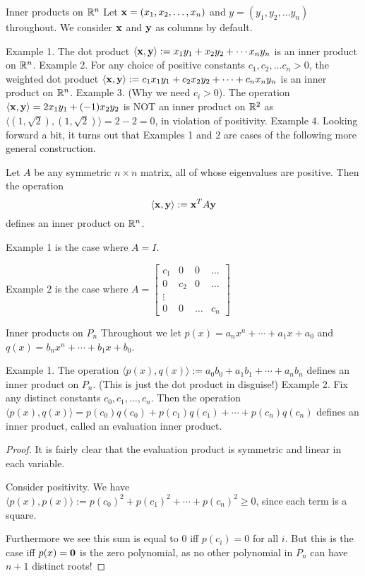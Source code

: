 \begin{frame}{Inner products on ${\mathbb R}^n$}
Let ${\mathbf x}=(x_1,x_2,\dots ,x_n)$ and $y=(y_1,y_2,\dots y_n)$ throughout. We consider ${\mathbf x}$ and ${\mathbf y}$ as columns by default. 

\alert{Example 1}. The \alert{dot product} $\langle{\mathbf x},{\mathbf y}\rangle:=x_1y_1+x_2y_2+\cdots x_ny_n$ is an inner product on ${\mathbb R}^n$. 
\bpause
\alert{Example 2}. For any choice of \alert{positive constants} $c_1,c_2,\dots c_n>0$, the \alert{weighted dot product} $\langle {\mathbf x},{\mathbf y}\rangle:=c_1x_1y_1+c_2x_2y_2+\cdots +c_nx_ny_n$ is an inner product on ${\mathbb R}^n$. 
\bpause
\alert{Example 3}. (Why we need $c_i>0$). The operation $\langle{\mathbf x},{\mathbf y}\rangle=2x_1y_1+(-1)x_2y_2$ is NOT an inner product on ${\mathbb R}^2$ as $\langle (1,\sqrt{2}), (1,\sqrt{2})\rangle=2-2=0$, in violation of positivity. 
\bpause
\alert{Example 4}. Looking forward a bit, it turns out that Examples 1 and 2 are cases of the following more general construction. 

Let $A$ be any symmetric $n\times n$ matrix, all of whose eigenvalues are \alert{positive}. Then the operation 
\[
\langle {\mathbf x}, {\mathbf y}\rangle:={\mathbf x}^TA{\mathbf y}
\]
defines an inner product on ${\mathbb R}^n$. 

Example 1 is the case where $A=I$. 

Example 2 is the case where $A=\begin{bmatrix}c_1&0&0&\dots\\
0&c_2&0&\dots \\
\vdots &\\
0&0&\dots&c_n
\end{bmatrix}$

\end{frame}
\begin{frame}{Inner products on $P_n$}
Throughout we let $p(x)=a_nx^n+\cdots +a_1x+a_0$ and $q(x)=b_nx^n+\cdots +b_1x+b_0$. 

\alert{Example 1}. The operation $\langle p(x),q(x)\rangle :=a_0b_0+a_1b_1+\cdots +a_nb_n$ defines an inner product on $P_n$. (This is just the dot product in disguise!) 
\bpause
\alert{Example 2}. Fix any distinct constants $c_0,c_1,\dots ,c_n$. Then the operation 
$\langle p(x), q(x)\rangle=p(c_0)q(c_0)+p(c_1)q(c_1)+\cdots +p(c_n)q(c_n)$ defines an inner product, called an \alert{evaluation inner product}.  
\pause
\begin{proof}
It is fairly clear that the evaluation product is symmetric and linear in each variable.

Consider positivity. We have $\langle p(x), p(x)\rangle:=p(c_0)^2+p(c_1)^2+\cdots +p(c_n)^2\geq 0$, since each term is a square.  

Furthermore we see this sum is equal to 0 iff $p(c_i)=0$ for all $i$. But this is the case iff $p(x)={\mathbf 0}$ is the zero polynomial, as no other polynomial in $P_n$ can have $n+1$ distinct roots!  
\end{proof}
\end{frame}
